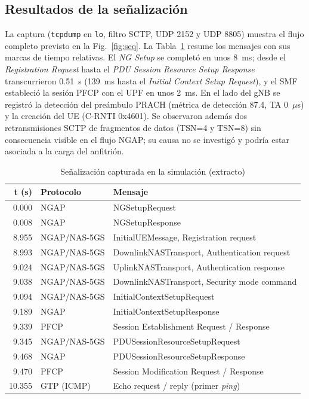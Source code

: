 \documentclass[conference]{IEEEtran}
\begin{document}
\subsection{Resultados de la señalización}
La captura (\texttt{tcpdump} en \texttt{lo}, filtro SCTP, UDP 2152 y UDP 8805) muestra el flujo completo previsto en la Fig.~\ref{fig:seq}. La Tabla~\ref{tab:senal} resume los mensajes con sus marcas de tiempo relativas. El \textit{NG Setup} se completó en unos 8~ms; desde el \textit{Registration Request} hasta el \textit{PDU Session Resource Setup Response} transcurrieron 0.51~s (139~ms hasta el \textit{Initial Context Setup Request}), y el SMF estableció la sesión PFCP con el UPF en unos 2~ms. En el lado del gNB se registró la detección del preámbulo PRACH (métrica de detección 87.4, TA 0~$\mu$s) y la creación del UE (C-RNTI 0x4601). Se observaron además dos retransmisiones SCTP de fragmentos de datos (TSN=4 y TSN=8) sin consecuencia visible en el flujo NGAP; su causa no se investigó y podría estar asociada a la carga del anfitrión.

\begin{table}[!t]
\caption{Señalización capturada en la simulación (extracto)}
\label{tab:senal}
\centering
\footnotesize
\renewcommand{\arraystretch}{1.15}
\begin{tabular}{rlp{4.4cm}}
\toprule
\textbf{t (s)} & \textbf{Protocolo} & \textbf{Mensaje} \\
\midrule
0.000 & NGAP & NGSetupRequest \\
0.008 & NGAP & NGSetupResponse \\
8.955 & NGAP/NAS-5GS & InitialUEMessage, Registration request \\
8.993 & NGAP/NAS-5GS & DownlinkNASTransport, Authentication request \\
9.024 & NGAP/NAS-5GS & UplinkNASTransport, Authentication response \\
9.038 & NGAP/NAS-5GS & DownlinkNASTransport, Security mode command \\
9.094 & NGAP/NAS-5GS & InitialContextSetupRequest \\
9.189 & NGAP & InitialContextSetupResponse \\
9.339 & PFCP & Session Establishment Request / Response \\
9.345 & NGAP/NAS-5GS & PDUSessionResourceSetupRequest \\
9.468 & NGAP & PDUSessionResourceSetupResponse \\
9.470 & PFCP & Session Modification Request / Response \\
10.355 & GTP (ICMP) & Echo request / reply (primer \textit{ping}) \\
\bottomrule
\end{tabular}
\end{table}
\end{document}
